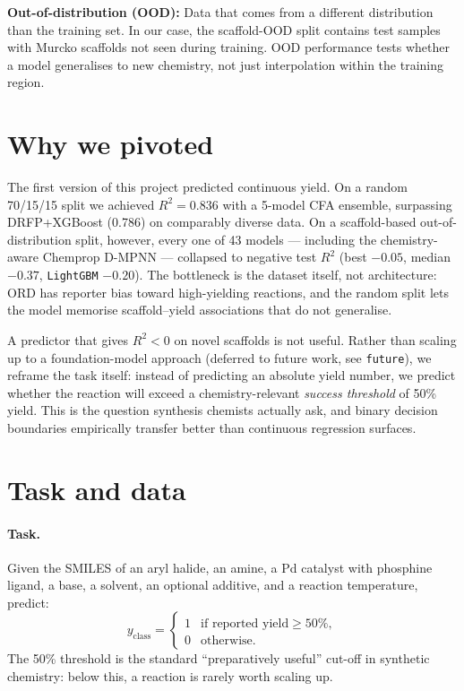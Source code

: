 \documentclass[11pt,a4paper]{article}
\begin{document}
\noindent\textbf{Out-of-distribution (OOD):} Data that comes from a different
distribution than the training set. In our case, the scaffold-OOD split contains
test samples with Murcko scaffolds not seen during training. OOD performance
tests whether a model generalises to new chemistry, not just interpolation
within the training region.

\section{Why we pivoted}\label{sec:pivot}

The first version of this project predicted continuous yield. On a random
70/15/15 split we achieved $R^2 = 0.836$ with a 5-model CFA ensemble, surpassing
DRFP+XGBoost (0.786) on comparably diverse data. On a scaffold-based
out-of-distribution split, however, every one of 43 models --- including the
chemistry-aware Chemprop D-MPNN --- collapsed to negative test $R^2$ (best
$-0.05$, median $-0.37$, \texttt{LightGBM} $-0.20$). The bottleneck is the
dataset itself, not architecture: ORD has reporter bias toward high-yielding
reactions, and the random split lets the model memorise scaffold--yield
associations that do not generalise.

A predictor that gives $R^2 < 0$ on novel scaffolds is not useful. Rather than
scaling up to a foundation-model approach (deferred to future work, see
\texttt{future}), we reframe the task itself: instead of predicting an absolute
yield number, we predict whether the reaction will exceed a chemistry-relevant
\emph{success threshold} of 50\% yield. This is the question synthesis chemists
actually ask, and binary decision boundaries empirically transfer better than
continuous regression surfaces.

\section{Task and data}

\paragraph{Task.}
Given the SMILES of an aryl halide, an amine, a Pd catalyst with phosphine
ligand, a base, a solvent, an optional additive, and a reaction temperature,
predict:
\[
y_{\text{class}} = \begin{cases}
1 & \text{if reported yield} \geq 50\%, \\
0 & \text{otherwise.}
\end{cases}
\]
The 50\% threshold is the standard ``preparatively useful'' cut-off in
synthetic chemistry: below this, a reaction is rarely worth scaling up.
\end{document}
